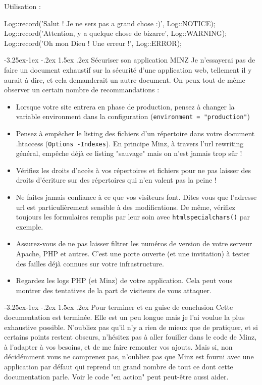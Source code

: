 \documentclass[a4paper,11pt]{article}
\makeatletter
\renewcommand{\subsection}{\@startsection{subsection}{2}{\z@}%
             {-3.25ex\@plus -1ex \@minus -.2ex}%
             {1.5ex \@plus .2ex}%
             {\color{bleuFonce}\normalfont\large\bfseries}}
\makeatother
\begin{document}
Utilisation :
\begin{PHP}
Log::record('Salut ! Je ne sers pas a grand chose :)', Log::NOTICE);
Log::record('Attention, y a quelque chose de bizarre', Log::WARNING);
Log::record('Oh mon Dieu ! Une erreur !', Log::ERROR);
\end{PHP}

\subsection{Sécuriser son application MINZ}
Je n'essayerai pas de faire un document exhaustif sur la sécurité d'une application web, tellement il y aurait à dire, et cela demanderait un autre document. On peux tout de même observer un certain nombre de recommandations :
\begin{itemize}
  \item Lorsque votre site entrera en phase de production, pensez à changer la variable environment dans la configuration (\texttt{environment = "production"})
  \item Pensez à empêcher le listing des fichiers d'un répertoire dans votre document .htaccess (\texttt{Options -Indexes}). En principe Minz, à travers l'url rewriting général, empêche déjà ce listing "sauvage" mais on n'est jamais trop sûr !
  \item Vérifiez les droits d'accès à vos répertoires et fichiers pour ne pas laisser des droits d'écriture sur des répertoires qui n'en valent pas la peine !
  \item Ne faites jamais confiance à ce que vos visiteurs font. Dites vous que l'adresse url est particulièrement sensible à des modifications. De même, vérifiez toujours les formulaires remplis par leur soin avec \texttt{htmlspecialchars()} par exemple.
  \item Assurez-vous de ne pas laisser filtrer les numéros de version de votre serveur Apache, PHP et autres. C'est une porte ouverte (et une invitation) à tester des failles déjà connues sur votre infrastructure.
  \item Regardez les logs PHP (et Minz) de votre application. Cela peut vous montrer des tentatives de la part de visiteurs de vous attaquer.
\end{itemize}

\subsection{Pour terminer et en guise de conclusion}
Cette documentation est terminée. Elle est un peu longue mais je l'ai voulue la plus exhaustive possible. N'oubliez pas qu'il n'y a rien de mieux que de pratiquer, et si certains points restent obscurs, n'hésitez pas à aller fouiller dans le code de Minz, à l'adapter à vos besoins, et de me faire remonter vos ajouts. Mais si, non décidémment vous ne comprenez pas, n'oubliez pas que Minz est fourni avec une application par défaut qui reprend un grand nombre de tout ce dont cette documentation parle. Voir le code "en action" peut peut-être aussi aider.
\end{document}
